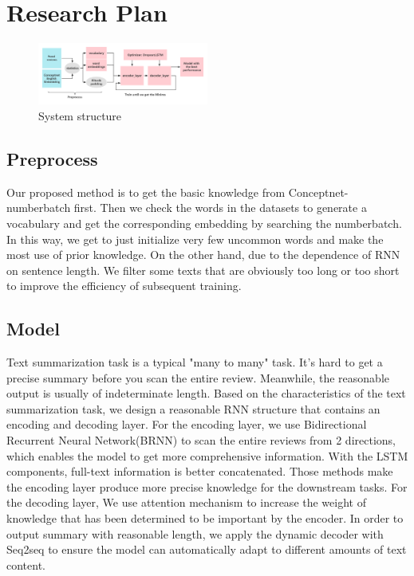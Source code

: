 \documentclass[conference]{IEEEtran}
\begin{document}
\section{Research Plan}
\begin{figure}[h]
\centering
\includegraphics[width=0.5\textwidth]{imgs/System_Structure.png}
\caption{System structure}
\label{fig:System_Structure}
\end{figure}
\subsection{Preprocess}
Our proposed method is to get the basic knowledge from Conceptnet-numberbatch first. Then we check the words in the datasets to generate a vocabulary and get the corresponding embedding by searching the numberbatch. In this way, we get to just initialize very few uncommon words and make the most use of prior knowledge. On the other hand, due to the dependence of RNN on sentence length. We filter some texts that are obviously too long or too short to improve the efficiency of subsequent training. 
\subsection{Model}
Text summarization task is a typical "many to many" task. It's hard to get a precise summary before you scan the entire review. Meanwhile, the reasonable output is usually of indeterminate length. Based on the characteristics of the text summarization task, we design a reasonable RNN structure that contains an encoding and decoding layer. For the encoding layer, we use Bidirectional Recurrent Neural Network(BRNN) to scan the entire reviews from 2 directions, which enables the model to get more comprehensive information. With the LSTM components, full-text information is better concatenated. Those methods make the encoding layer produce more precise knowledge for the downstream tasks. For the decoding layer, We use attention mechanism to increase the weight of knowledge that has been determined to be important by the encoder. In order to output summary with reasonable length, we apply the dynamic decoder with Seq2seq to ensure the model can automatically adapt to different amounts of text content.
\end{document}
